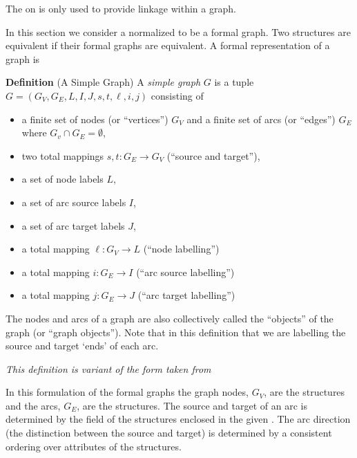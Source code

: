 \documentclass{cekarticle}
\begin{document}
The  on  is only used to
provide linkage within a graph.

In this section we consider a normalized  to
be a formal graph. Two  structures are
equivalent if their formal graphs are equivalent. A formal
representation of a graph is

\textbf{Definition} (A Simple Graph) A \emph{simple graph} $G$ is a
tuple $G = (G_{V}, G_{E}, L, I, J, s, t, \ell, i, j)$
consisting of
\begin{itemize}

\item a finite set of nodes (or ``vertices'') $G_{V}$ and a finite set of arcs (or ``edges'') $G_{E}$
        where $G_{v} \cap G_{E} = \emptyset$,

\item two total mappings $s, t : G_{E} \rightarrow G_{V}$ (``source and target''),

\item a set of node labels $L$,

\item a set of arc source labels $I$,

\item a set of arc target labels $J$,

\item a total mapping $\ell : G_{V} \rightarrow L$ (``node labelling'')

\item a total mapping $i : G_{E} \rightarrow I$ (``arc source labelling'')

\item a total mapping $j : G_{E} \rightarrow J$ (``arc target labelling'')

\end{itemize}
The nodes and arcs of a graph are also collectively called the
``objects'' of the graph (or ``graph objects'').  Note that in
this definition that we are labelling the source and target `ends'
of each arc.

\emph{This definition is variant of the form taken from
\citep{rudolf:1998}}

In this formulation of the formal graphs the graph nodes, $G_{V}$,
are the  structures and the arcs,
$G_{E}$, are the  structures.  The source and
target of an arc is determined by the 
field of the  structures enclosed in
the given . The arc direction (the distinction
between the source and target) is determined by a consistent
ordering over  attributes of the
 structures.
\end{document}
